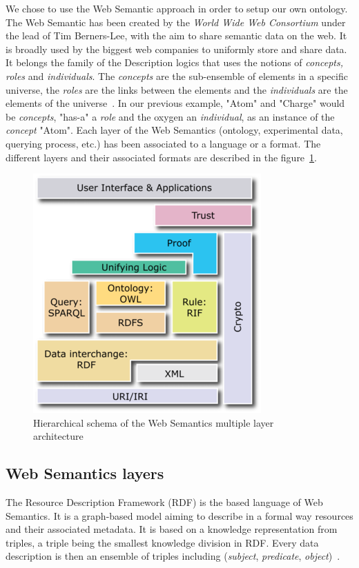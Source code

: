 \documentclass{vgtc}                          %
\begin{document}
We chose to use the Web Semantic approach in order to setup our own ontology. 
The Web Semantic has been created by the \textit{World Wide Web Consortium} under the lead of Tim Berners-Lee, with the aim to share semantic data on the web. It is broadly used by the biggest web companies to uniformly store and share data. It belongs the family of the Description logics that uses the notions of \textit{concepts, roles} and \textit{individuals}. 
The \textit{concepts} are the sub-ensemble of elements in a specific universe, the \textit{roles} are the links between the elements and the \textit{individuals} are the elements of the universe~\cite{}. In our previous example, "Atom" and "Charge" would be \textit{concepts}, "has-a" a \textit{role} and the oxygen an \textit{individual}, as an instance of the \textit{concept} "Atom".
Each layer of the Web Semantics (ontology, experimental data, querying process, etc.) has been associated to a language or a format. The different layers and their associated formats are described in the figure~\ref{web_semantic_hierarchy}. 

\begin{figure}[htb]
  \centering
  \includegraphics[width=.5\linewidth]{figures/web_semantic_hierarchy.png}
  \caption{Hierarchical schema of the Web Semantics multiple layer architecture}
  \label{web_semantic_hierarchy}
\end{figure}

\subsection{Web Semantics layers}

The Resource Description Framework (RDF) is the based language of Web Semantics. It is a graph-based model aiming to describe in a formal way resources and their associated metadata. It is based on a knowledge representation from triples, a triple being the smallest knowledge division in RDF. Every data description is then an ensemble of triples including (\textit{subject}, \textit{predicate}, \textit{object})~\cite{godel1999bach}.
\end{document}
